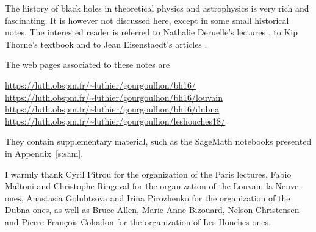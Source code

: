 The history of black holes in theoretical physics and astrophysics is
very rich and fascinating. It is however not discussed here, except in some
small historical notes. The interested
reader is referred to Nathalie Deruelle's lectures \cite{Derue09}, to Kip Thorne's
textbook \cite{Thorn94} and to Jean Eisenstaedt's articles \cite{Eisen82,Eisen93}.


The web pages associated to these notes are
\begin{center}
\url{https://luth.obspm.fr/~luthier/gourgoulhon/bh16/}\\
\url{https://luth.obspm.fr/~luthier/gourgoulhon/bh16/louvain}\\
\url{https://luth.obspm.fr/~luthier/gourgoulhon/bh16/dubna}\\
\url{https://luth.obspm.fr/~luthier/gourgoulhon/leshouches18/}
\end{center}
They contain supplementary material, such as the SageMath notebooks presented in
Appendix~\ref{s:sam}.

\vspace{2ex}

I warmly thank Cyril Pitrou for the organization of the Paris lectures,
Fabio Maltoni and Christophe Ringeval for the organization of the Louvain-la-Neuve ones,
Anastasia Golubtsova and Irina Pirozhenko for the
organization of the Dubna ones, as well as Bruce Allen, Marie-Anne Bizouard, Nelson
Christensen and Pierre-François Cohadon for the organization of Les Houches ones.
